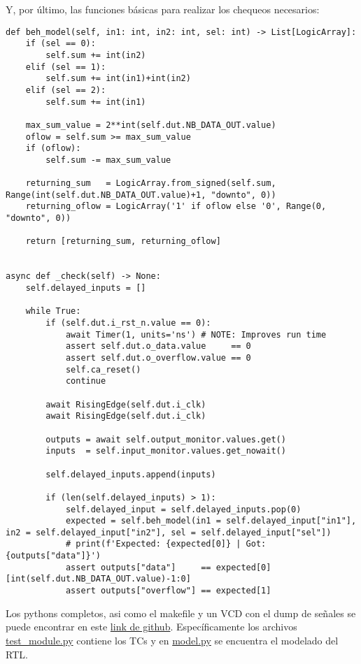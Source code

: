 Y, por último, las funciones básicas para realizar los chequeos necesarios:
\begin{verbatim}
def beh_model(self, in1: int, in2: int, sel: int) -> List[LogicArray]:
    if (sel == 0):
        self.sum += int(in2)
    elif (sel == 1):
        self.sum += int(in1)+int(in2)
    elif (sel == 2):
        self.sum += int(in1)

    max_sum_value = 2**int(self.dut.NB_DATA_OUT.value)
    oflow = self.sum >= max_sum_value
    if (oflow):
        self.sum -= max_sum_value

    returning_sum   = LogicArray.from_signed(self.sum, Range(int(self.dut.NB_DATA_OUT.value)+1, "downto", 0))
    returning_oflow = LogicArray('1' if oflow else '0', Range(0, "downto", 0))

    return [returning_sum, returning_oflow]


async def _check(self) -> None:
    self.delayed_inputs = []

    while True:
        if (self.dut.i_rst_n.value == 0):
            await Timer(1, units='ns') # NOTE: Improves run time
            assert self.dut.o_data.value     == 0
            assert self.dut.o_overflow.value == 0
            self.ca_reset()
            continue

        await RisingEdge(self.dut.i_clk)
        await RisingEdge(self.dut.i_clk)

        outputs = await self.output_monitor.values.get()
        inputs  = self.input_monitor.values.get_nowait()
        
        self.delayed_inputs.append(inputs)

        if (len(self.delayed_inputs) > 1):
            self.delayed_input = self.delayed_inputs.pop(0)
            expected = self.beh_model(in1 = self.delayed_input["in1"], in2 = self.delayed_input["in2"], sel = self.delayed_input["sel"])
            # print(f'Expected: {expected[0]} | Got: {outputs["data"]}')
            assert outputs["data"]     == expected[0][int(self.dut.NB_DATA_OUT.value)-1:0]
            assert outputs["overflow"] == expected[1]
\end{verbatim}

Los pythons completos, asi como el makefile y un VCD con el dump de señales se puede encontrar en este \href{https://github.com/msebgarcia/DDA2024/tree/938fbd1fccef5ac96fa643486dc815432e2d11ef/GP01/sum_accumulator}{link de github}. Específicamente los archivos \href{https://github.com/msebgarcia/DDA2024/blob/main/GP01/sum_accumulator/tb/test_module.py}{test\_module.py} contiene los TCs y en \href{https://github.com/msebgarcia/DDA2024/blob/main/GP01/sum_accumulator/tb/model.py}{model.py} se encuentra el modelado del RTL.
\\

